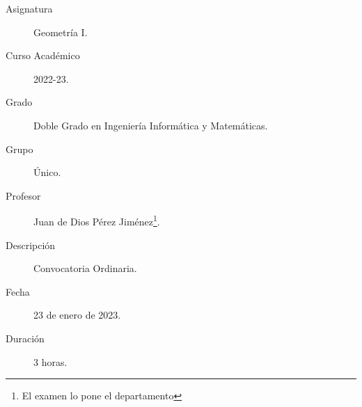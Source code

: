 \documentclass[12pt]{article}
\begin{document}
\newcommand{\F}{{\mathcal{F}}} %
\newcommand{\R}{{\mathbb{R}}}  %
\newcommand{\Q}{{\mathbb{Q}}}  %
\newcommand{\Z}{{\mathbb{Z}}}  %
\newcommand{\N}{{\mathbb{N}}}  %
\newcommand{\C}{{\mathbb{C}}}  %
\newcommand{\U}{{\mathcal{U}}} %




\begin{description}
	\item[Asignatura] Geometría I.
	\item[Curso Académico] 2022-23.
	\item[Grado] Doble Grado en Ingeniería Informática y Matemáticas.
	\item[Grupo] Único.
	\item[Profesor] Juan de Dios Pérez Jiménez\footnote{El examen lo pone el departamento}.
	\item[Descripción] Convocatoria Ordinaria.
	\item[Fecha] 23 de enero de 2023.
	\item[Duración] 3 horas.

\end{description}
\newpage
\end{document}
